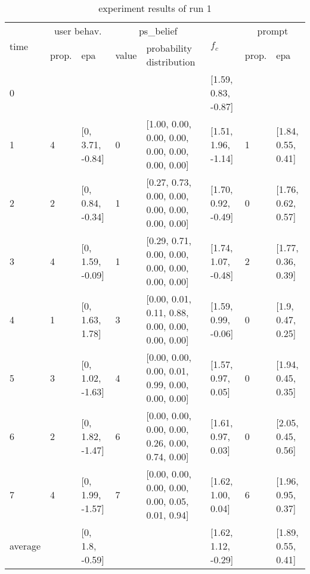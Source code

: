 \begin{table}[htbp]\footnotesize
\caption{experiment results of run 1}
\begin{tabular}{|p{0.4cm}|p{0.6cm}|l|p{0.6cm}|p{3.3cm}|l|p{0.6cm}|l|}
\hline

\multirow{2}{*}{time} & \multicolumn{2}{c|}{user behav.} & \multicolumn{2}{c|}{ps\_belief} &
\multirow{2}{*}{$f_c$} & \multicolumn{2}{c|}{prompt} \\ \cline{2-5}\cline{ 7- 8}
& prop. & epa & value & probability distribution &  & prop. & epa \\ \hline

0 & \multicolumn{ 1}{l|}{} &  & \multicolumn{1}{l|}{} &  & [1.59, 0.83, -0.87] & \multicolumn{ 1}{l|}{} &  \\ \hline
1 & 4 & [0, 3.71, -0.84] & 0 & [1.00, 0.00, 0.00, 0.00, 0.00, 0.00, 0.00, 0.00] & [1.51, 1.96, -1.14] & 1 & [1.84, 0.55, 0.41] \\ \hline
2 & 2 & [0, 0.84, -0.34] & 1 & [0.27, 0.73, 0.00, 0.00, 0.00, 0.00, 0.00, 0.00] & [1.70, 0.92, -0.49] & 0 & [1.76, 0.62, 0.57] \\ \hline
3 & 4 & [0, 1.59, -0.09] & 1 & [0.29, 0.71, 0.00, 0.00, 0.00, 0.00, 0.00, 0.00] & [1.74, 1.07, -0.48] & 2 & [1.77, 0.36, 0.39] \\ \hline
4 & 1 & [0, 1.63, 1.78] & 3 & [0.00, 0.01, 0.11, 0.88, 0.00, 0.00, 0.00, 0.00] & [1.59, 0.99, -0.06] & 0 & [1.9, 0.47, 0.25] \\ \hline
5 & 3 & [0, 1.02, -1.63] & 4 & [0.00, 0.00, 0.00, 0.01, 0.99, 0.00, 0.00, 0.00] & [1.57, 0.97, 0.05] & 0 & [1.94, 0.45, 0.35] \\ \hline
6 & 2 & [0, 1.82, -1.47] & 6 & [0.00, 0.00, 0.00, 0.00, 0.26, 0.00, 0.74, 0.00] & [1.61, 0.97, 0.03] & 0 & [2.05, 0.45, 0.56] \\ \hline
7 & 4 & [0, 1.99, -1.57] & 7 & [0.00, 0.00, 0.00, 0.00, 0.00, 0.05, 0.01, 0.94] & [1.62, 1.00, 0.04] & 6 & [1.96, 0.95, 0.37] \\ \hline
\multicolumn{1}{|l|}{average} & \multicolumn{1}{l|}{} & [0, 1.8, -0.59] & \multicolumn{1}{l|}{} &  & [1.62, 1.12, -0.29] & \multicolumn{1}{l|}{} & [1.89, 0.55, 0.41] \\ \hline
\end{tabular}
\label{}
\end{table}


